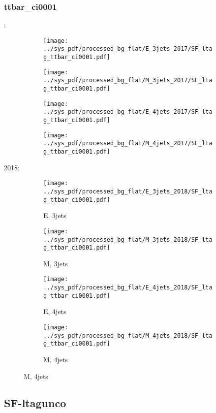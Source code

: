 \documentclass{beamer}
\begin{document}
\begin{frame}
\frametitle{ttbar_ci0001}
\fontsize{5}{1}:
\begin{figure}
\centering
\begin{subfigure}[b]{0.24\textwidth}
\texttt{[image: ../sys\_pdf/processed\_bg\_flat/E\_3jets\_2017/SF\_ltag\_ttbar\_ci0001.pdf]}
\end{subfigure}
\begin{subfigure}[b]{0.24\textwidth}
\texttt{[image: ../sys\_pdf/processed\_bg\_flat/M\_3jets\_2017/SF\_ltag\_ttbar\_ci0001.pdf]}
\end{subfigure}
\begin{subfigure}[b]{0.24\textwidth}
\texttt{[image: ../sys\_pdf/processed\_bg\_flat/E\_4jets\_2017/SF\_ltag\_ttbar\_ci0001.pdf]}
\end{subfigure}
\begin{subfigure}[b]{0.24\textwidth}
\texttt{[image: ../sys\_pdf/processed\_bg\_flat/M\_4jets\_2017/SF\_ltag\_ttbar\_ci0001.pdf]}
\end{subfigure}
\end{figure}
2018:
\begin{figure}
\centering
\begin{subfigure}[b]{0.24\textwidth}
\texttt{[image: ../sys\_pdf/processed\_bg\_flat/E\_3jets\_2018/SF\_ltag\_ttbar\_ci0001.pdf]}
\captionsetup{font=tiny}
\caption{E, 3jets}
\end{subfigure}
\begin{subfigure}[b]{0.24\textwidth}
\texttt{[image: ../sys\_pdf/processed\_bg\_flat/M\_3jets\_2018/SF\_ltag\_ttbar\_ci0001.pdf]}
\captionsetup{font=tiny}
\caption{M, 3jets}
\end{subfigure}
\begin{subfigure}[b]{0.24\textwidth}
\texttt{[image: ../sys\_pdf/processed\_bg\_flat/E\_4jets\_2018/SF\_ltag\_ttbar\_ci0001.pdf]}
\captionsetup{font=tiny}
\caption{E, 4jets}
\end{subfigure}
\begin{subfigure}[b]{0.24\textwidth}
\texttt{[image: ../sys\_pdf/processed\_bg\_flat/M\_4jets\_2018/SF\_ltag\_ttbar\_ci0001.pdf]}
\captionsetup{font=tiny}
\caption{M, 4jets}
\end{subfigure}
\end{figure}
\end{frame}


\subsection{SF-ltagunco}
\end{document}
